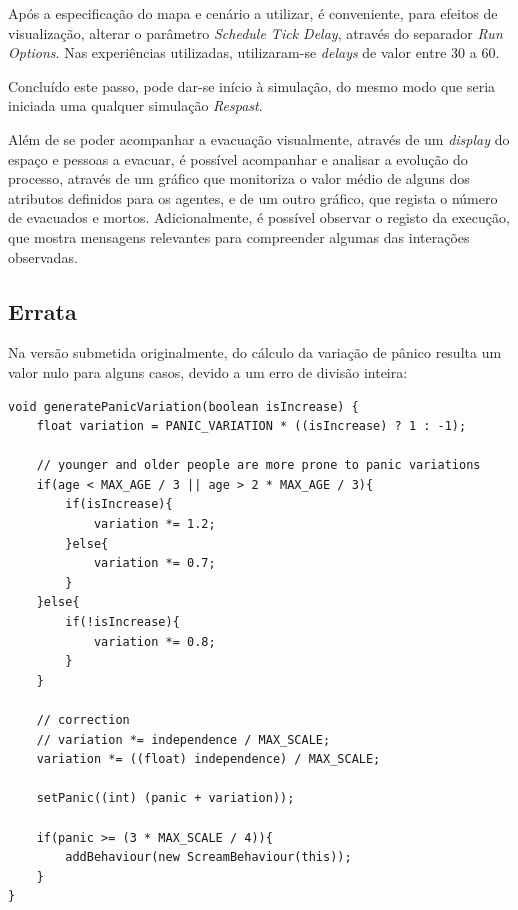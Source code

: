 \documentclass[12pt]{article}
\begin{document}
\begin{titlepage}
Após a especificação do mapa e cenário a utilizar, é conveniente, para efeitos de visualização, alterar o parâmetro \textit{Schedule Tick Delay}, através do separador \textit{Run Options}. Nas experiências utilizadas, utilizaram-se \textit{delays} de valor entre 30 a 60.

Concluído este passo, pode dar-se início à simulação, do mesmo modo que seria iniciada uma qualquer simulação \textit{Respast}.

Além de se poder acompanhar a evacuação visualmente, através de um \textit{display} do espaço e pessoas a evacuar, é possível acompanhar e analisar a evolução do processo, através de um gráfico que monitoriza o valor médio de alguns dos atributos definidos para os agentes, e de um outro gráfico, que regista o número de evacuados e mortos. Adicionalmente, é possível observar o registo da execução, que mostra mensagens relevantes para compreender algumas das interações observadas.

\subsection{Errata}

Na versão submetida originalmente, do cálculo da variação de pânico resulta um valor nulo para alguns casos, devido a um erro de divisão inteira:

\begin{lstlisting}
void generatePanicVariation(boolean isIncrease) {
	float variation = PANIC_VARIATION * ((isIncrease) ? 1 : -1);
	
	// younger and older people are more prone to panic variations 
	if(age < MAX_AGE / 3 || age > 2 * MAX_AGE / 3){
		if(isIncrease){
			variation *= 1.2;	
		}else{
			variation *= 0.7;
		}
	}else{
		if(!isIncrease){
			variation *= 0.8;
		}
	}
	
	// correction
	// variation *= independence / MAX_SCALE; 
	variation *= ((float) independence) / MAX_SCALE; 
	
	setPanic((int) (panic + variation));		
	
	if(panic >= (3 * MAX_SCALE / 4)){
		addBehaviour(new ScreamBehaviour(this));
	}
}
\end{lstlisting}

\end{titlepage}
\end{document}
